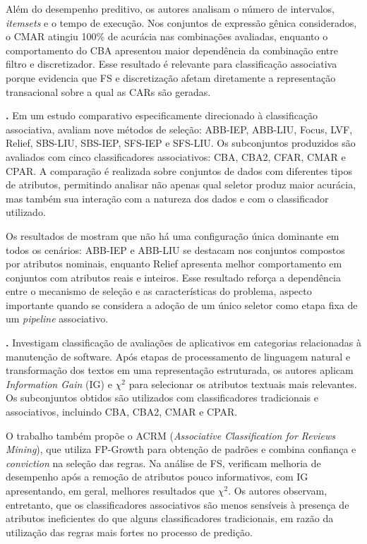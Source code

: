 Além do desempenho preditivo, os autores analisam o
número de intervalos, \textit{itemsets} e o tempo de execução. Nos conjuntos de
expressão gênica considerados, o CMAR atingiu 100\% de acurácia nas combinações
avaliadas, enquanto o comportamento do CBA apresentou maior dependência da
combinação entre filtro e discretizador. Esse resultado é relevante para
classificação associativa porque evidencia que FS e discretização afetam
diretamente a representação transacional sobre a qual as CARs são geradas.

\medskip

\noindent\textbf{.}
Em um estudo comparativo especificamente direcionado à classificação
associativa,  avaliam nove métodos de seleção:
ABB-IEP, ABB-LIU, Focus, LVF, Relief, SBS-LIU, SBS-IEP, SFS-IEP e SFS-LIU.
Os subconjuntos produzidos são avaliados com cinco classificadores
associativos: CBA, CBA2, CFAR, CMAR e CPAR. A comparação é realizada sobre
conjuntos de dados com diferentes tipos de atributos, permitindo analisar não
apenas qual seletor produz maior acurácia, mas também sua interação com a
natureza dos dados e com o classificador utilizado.

Os resultados de  mostram que não há uma
configuração única dominante em todos os cenários: ABB-IEP e ABB-LIU se
destacam nos conjuntos compostos por atributos nominais, enquanto Relief
apresenta melhor comportamento em conjuntos com atributos reais e inteiros.
Esse resultado reforça a dependência entre o mecanismo de seleção e as
características do problema, aspecto importante quando se considera a adoção de
um único seletor como etapa fixa de um \textit{pipeline} associativo.

\medskip

\noindent\textbf{.}
Investigam classificação de avaliações
de aplicativos em categorias relacionadas à manutenção de software. Após etapas
de processamento de linguagem natural e transformação dos textos em uma
representação estruturada, os autores aplicam \textit{Information Gain} (IG) e
$\chi^2$ para selecionar os atributos textuais mais relevantes. Os subconjuntos
obtidos são utilizados com classificadores tradicionais e associativos,
incluindo CBA, CBA2, CMAR e CPAR.

O trabalho também propõe o ACRM (\textit{Associative Classification for Reviews
Mining}), que utiliza FP-Growth para obtenção de padrões e combina confiança e
\textit{conviction} na seleção das regras. Na análise de FS,
 verificam melhoria de desempenho após a
remoção de atributos pouco informativos, com IG apresentando, em geral, melhores
resultados que $\chi^2$. Os autores observam, entretanto, que os classificadores
associativos são menos sensíveis à presença de atributos ineficientes do que
alguns classificadores tradicionais, em razão da utilização das regras mais
fortes no processo de predição.

